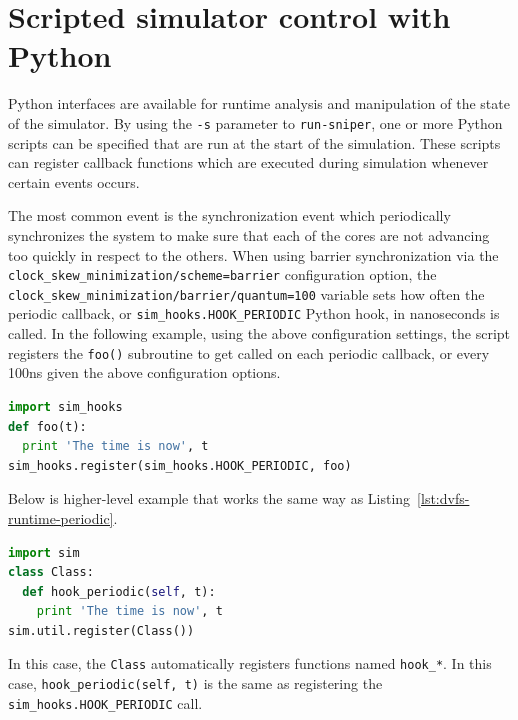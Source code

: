 \documentclass[a4paper,11pt,titlepage]{article}
\newcommand{\sourcecode}[1]{{\tt #1}}
\newcommand{\cmd}[1]{{\tt #1}}
\newcommand{\opt}[1]{{\tt #1}}
\begin{document}
\section{Scripted simulator control with Python}
\label{scripting}

Python interfaces are available for runtime analysis and manipulation of the state of the simulator.
By using the \opt{-s} parameter to \cmd{run-sniper}, one or more Python scripts can be specified
that are run at the start of the simulation. These scripts can register callback functions which are
executed during simulation whenever certain events occurs.

The most common event is the synchronization event which periodically synchronizes the system to make sure
that each of the cores are not advancing too quickly in respect to the others.
When using barrier synchronization
via the \sourcecode{clock\_skew\_minimization/scheme=barrier} configuration option, the
\sourcecode{clock\_skew\_minimization/barrier/quantum=100} variable sets how often the periodic callback,
or \sourcecode{sim\_hooks.HOOK\_PERIODIC} Python hook, in nanoseconds is called.  In the following example,
using the above configuration settings, the script registers the \sourcecode{foo()} subroutine to
get called on each periodic callback, or every 100ns given the above configuration options.

\begin{lstlisting}[label=lst:dvfs-runtime-periodic,caption=DVFS Periodic Callback Example,rulecolor=\color{DarkSlateBlue},language=Python]
import sim_hooks
def foo(t):
  print 'The time is now', t
sim_hooks.register(sim_hooks.HOOK_PERIODIC, foo)
\end{lstlisting}

Below is higher-level example that works the same way as Listing~\ref{lst:dvfs-runtime-periodic}.


\begin{lstlisting}[label=lst:dvfs-runtime-periodic-class,caption=High Level DVFS Periodic Callback Example,rulecolor=\color{DarkSlateBlue},language=Python]
import sim
class Class:
  def hook_periodic(self, t):
    print 'The time is now', t
sim.util.register(Class())
\end{lstlisting}

In this case, the \sourcecode{Class} automatically registers functions named \sourcecode{hook\_*}.  In this case,
\sourcecode{hook\_periodic(self, t)} is the same as registering the \sourcecode{sim\_hooks.HOOK\_PERIODIC} call.
\end{document}
